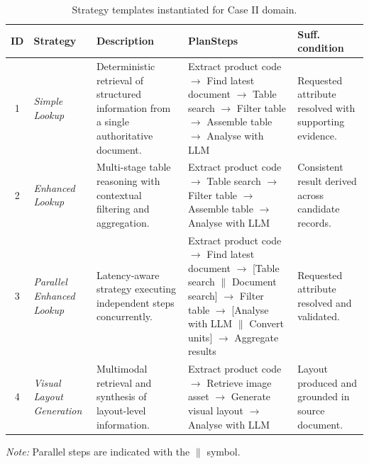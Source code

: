 \documentclass[largeformat]{interact}
\begin{document}
\begin{table}[!htbp]
\captionsetup{width=0.92\linewidth, skip=2pt}
    \caption{Strategy templates instantiated for Case II domain.}
    \label{tab:saab_strategy_templates}
    \centering
    \small
    \setlength{\tabcolsep}{6pt}
    \renewcommand{\arraystretch}{1.1}
    \begin{tabularx}{\textwidth}{c p{2.2cm} X p{5cm} X}
    
    \toprule
    \textbf{ID} &
    \textbf{Strategy} &
    \textbf{Description} &
    \textbf{PlanSteps} &
    \textbf{Suff. condition} \\
    
    \midrule
    
    1 & \textit{Simple Lookup} &
    Deterministic retrieval of structured information from a single authoritative document. & Extract product code $\rightarrow$ Find latest document $\rightarrow$ Table search
    $\rightarrow$ Filter table $\rightarrow$ Assemble table $\rightarrow$ Analyse with LLM & Requested attribute resolved with supporting evidence. \\
    
    \midrule
    
    2 & \textit{Enhanced Lookup} &
    Multi-stage table reasoning with contextual filtering and aggregation. &
    Extract product code $\rightarrow$ Table search $\rightarrow$ Filter table
    $\rightarrow$ Assemble table $\rightarrow$ Analyse with LLM & Consistent result derived across candidate records. \\
    
    \midrule
    
    3 & \textit{Parallel Enhanced Lookup} &
    Latency-aware strategy executing independent steps concurrently. &
    Extract product code $\rightarrow$ Find latest document $\rightarrow$
    [Table search $\parallel$ Document search]
    $\rightarrow$ Filter table $\rightarrow$
    [Analyse with LLM $\parallel$ Convert units]
    $\rightarrow$ Aggregate results & Requested attribute resolved and validated. \\
    
    \midrule
    
    4 & \textit{Visual Layout Generation} &
    Multimodal retrieval and synthesis of layout-level information. &
    Extract product code $\rightarrow$ Retrieve image asset
    $\rightarrow$ Generate visual layout $\rightarrow$ Analyse with LLM &
    Layout produced and grounded in source document. \\
    
    \bottomrule
    \end{tabularx}
    
    \vspace{2mm}
    \raggedright
    \footnotesize
    \textit{Note:} Parallel steps are indicated with the $\parallel$ symbol.
\end{table}
\end{document}
